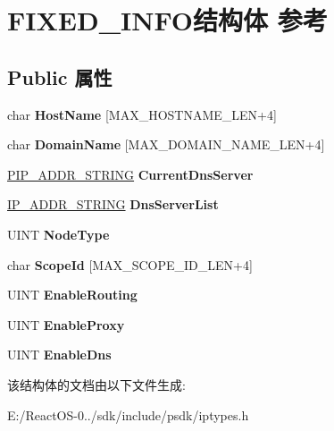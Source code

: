 \hypertarget{struct_f_i_x_e_d___i_n_f_o}{}\section{F\+I\+X\+E\+D\+\_\+\+I\+N\+F\+O结构体 参考}
\label{struct_f_i_x_e_d___i_n_f_o}
\subsection*{Public 属性}
\begin{DoxyCompactItemize}
\item 
\mbox{\label{struct_f_i_x_e_d___i_n_f_o_a84f3e9c7f032e0b0562810d0b78a57bc}} 
char {\bfseries Host\+Name} \mbox{[}M\+A\+X\+\_\+\+H\+O\+S\+T\+N\+A\+M\+E\+\_\+\+L\+EN+4\mbox{]}
\item 
\mbox{\label{struct_f_i_x_e_d___i_n_f_o_acd7d254c19f92fa30c7a1843ceca1c2f}} 
char {\bfseries Domain\+Name} \mbox{[}M\+A\+X\+\_\+\+D\+O\+M\+A\+I\+N\+\_\+\+N\+A\+M\+E\+\_\+\+L\+EN+4\mbox{]}
\item 
\mbox{\label{struct_f_i_x_e_d___i_n_f_o_a02f7b4516e62cb916db154ecf92a66ae}} 
\hyperlink{struct___i_p___a_d_d_r___s_t_r_i_n_g}{P\+I\+P\+\_\+\+A\+D\+D\+R\+\_\+\+S\+T\+R\+I\+NG} {\bfseries Current\+Dns\+Server}
\item 
\mbox{\label{struct_f_i_x_e_d___i_n_f_o_a39d9c28af590b3f15eeaeed68e23f3b7}} 
\hyperlink{struct___i_p___a_d_d_r___s_t_r_i_n_g}{I\+P\+\_\+\+A\+D\+D\+R\+\_\+\+S\+T\+R\+I\+NG} {\bfseries Dns\+Server\+List}
\item 
\mbox{\label{struct_f_i_x_e_d___i_n_f_o_aba2f8e1a81da8861a54c9692b05098ba}} 
U\+I\+NT {\bfseries Node\+Type}
\item 
\mbox{\label{struct_f_i_x_e_d___i_n_f_o_ac5c8767a39e0e34f5db436871d27c8c1}} 
char {\bfseries Scope\+Id} \mbox{[}M\+A\+X\+\_\+\+S\+C\+O\+P\+E\+\_\+\+I\+D\+\_\+\+L\+EN+4\mbox{]}
\item 
\mbox{\label{struct_f_i_x_e_d___i_n_f_o_a5cd6ac64edfe3fc2d2e0686af6c0fe7b}} 
U\+I\+NT {\bfseries Enable\+Routing}
\item 
\mbox{\label{struct_f_i_x_e_d___i_n_f_o_acc3b506523de9937c1a522024adc0bf3}} 
U\+I\+NT {\bfseries Enable\+Proxy}
\item 
\mbox{\label{struct_f_i_x_e_d___i_n_f_o_ab6dd05c21ea82908eb8352af0ffea8cc}} 
U\+I\+NT {\bfseries Enable\+Dns}
\end{DoxyCompactItemize}


该结构体的文档由以下文件生成\+:\begin{DoxyCompactItemize}
\item 
E\+:/\+React\+O\+S-\/0../sdk/include/psdk/iptypes.\+h\end{DoxyCompactItemize}
